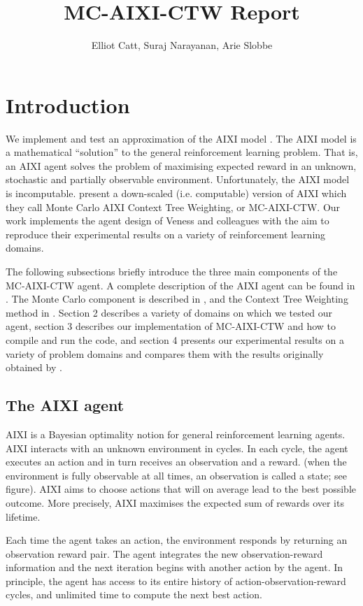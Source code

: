 \documentclass{article}
\title{MC-AIXI-CTW Report}
\author{Elliot Catt, Suraj Narayanan, Arie Slobbe}
\theoremstyle{definition}
\newtheorem{primary statistics}[definition]{Primary Statistics}
\newtheorem{auxiliary statistics}[definition]{Auxiliary Statistics}
\begin{document}
\maketitle

\section{Introduction}
We implement and test an approximation of the AIXI model \citep{hutter2005universal}. The AIXI model is a mathematical “solution” to the general reinforcement learning problem. That is, an AIXI agent solves the problem of maximising expected reward in an unknown, stochastic and partially observable environment. Unfortunately, the AIXI model is incomputable. \citep{veness2011monte} present a down-scaled (i.e. computable) version of AIXI which they call Monte Carlo AIXI Context Tree Weighting, or MC-AIXI-CTW. Our work implements the agent design of Veness and colleagues with the aim to reproduce their experimental results on a variety of reinforcement learning domains.

The following subsections briefly introduce the three main components of the MC-AIXI-CTW agent. A complete description of the AIXI agent can be found in \citep{hutter2005universal}. The Monte Carlo component is described in \citep{kocsis2006bandit}, and the Context Tree Weighting method in \citep{willems1995context}.  Section 2 describes a variety of domains on which we tested our agent, section 3 describes our implementation of MC-AIXI-CTW and how to compile and run the code, and section 4 presents our experimental results on a variety of problem domains and compares them with the results originally obtained by \citep{veness2011monte}.

\subsection{The AIXI agent}
AIXI is a Bayesian optimality notion for general reinforcement learning agents. AIXI interacts with an unknown environment in cycles. In each cycle, the agent executes an action and in turn receives an observation and a reward. (when the environment is fully observable at all times, an observation is called a state; see figure). AIXI aims to choose actions that will on average lead to the best possible outcome. More precisely, AIXI maximises the expected sum of rewards over its lifetime.

Each time the agent takes an action, the environment responds by returning an observation reward pair. The agent integrates the new observation-reward information and the next iteration begins with another action by the agent. In principle, the agent has access to its entire history of action-observation-reward cycles, and unlimited time to compute the next best action.  
\end{document}
